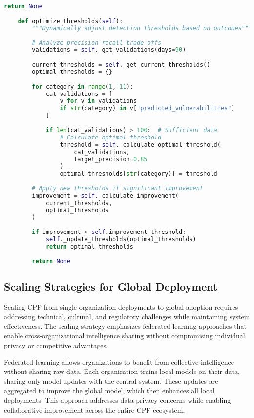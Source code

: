 \documentclass[11pt,a4paper]{article}
\begin{document}
\begin{lstlisting}[language=Python, caption=Self-Improving Feedback System]
        return None
    
    def optimize_thresholds(self):
        """Dynamically adjust detection thresholds based on outcomes"""
        
        # Analyze precision-recall trade-offs
        validations = self._get_validations(days=90)
        
        current_thresholds = self._get_current_thresholds()
        optimal_thresholds = {}
        
        for category in range(1, 11):
            cat_validations = [
                v for v in validations 
                if str(category) in v["predicted_vulnerabilities"]
            ]
            
            if len(cat_validations) > 100:  # Sufficient data
                # Calculate optimal threshold
                threshold = self._calculate_optimal_threshold(
                    cat_validations,
                    target_precision=0.85
                )
                optimal_thresholds[str(category)] = threshold
        
        # Apply new thresholds if significant improvement
        improvement = self._calculate_improvement(
            current_thresholds,
            optimal_thresholds
        )
        
        if improvement > self.improvement_threshold:
            self._update_thresholds(optimal_thresholds)
            return optimal_thresholds
        
        return None
\end{lstlisting}

\subsection{Scaling Strategies for Global Deployment}

Scaling CPF from single-organization deployments to global adoption requires addressing technical, cultural, and regulatory challenges while maintaining system effectiveness. The scaling strategy emphasizes federated learning approaches that enable cross-organizational intelligence sharing without compromising individual privacy or competitive advantages.

Federated learning allows organizations to benefit from collective intelligence without sharing raw data. Each organization trains local models on their data, sharing only model updates with the central system. These updates are aggregated to improve the global model, which then enhances all local deployments. This approach addresses data privacy concerns while enabling collaborative improvement across the entire CPF ecosystem.
\end{document}
